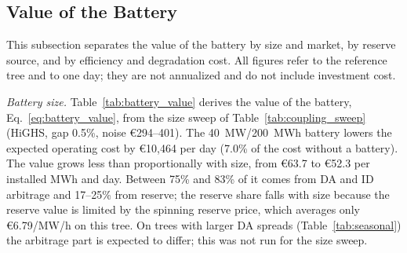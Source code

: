 \documentclass[5p,times,twocolumn]{elsarticle}
\begin{document}
\subsection{Value of the Battery}
\label{sec:attribution}
\label{sec:battery}
This subsection separates the value of the battery by size and market, by reserve source, and by efficiency and degradation cost. All figures refer to the reference tree and to one day; they are not annualized and do not include investment cost.

\textit{Battery size.} Table~\ref{tab:battery_value} derives the value of the battery, Eq.~\eqref{eq:battery_value}, from the size sweep of Table~\ref{tab:coupling_sweep} (HiGHS, gap 0.5\%, noise \euro 294--401). The 40~MW/200~MWh battery lowers the expected operating cost by \euro 10,464 per day (7.0\% of the cost without a battery). The value grows less than proportionally with size, from \euro 63.7 to \euro 52.3 per installed MWh and day. Between 75\% and 83\% of it comes from DA and ID arbitrage and 17--25\% from reserve; the reserve share falls with size because the reserve value is limited by the spinning reserve price, which averages only \euro 6.79/MW/h on this tree. On trees with larger DA spreads (Table~\ref{tab:seasonal}) the arbitrage part is expected to differ; this was not run for the size sweep.

\begin{table}[t]
\caption{Value of the battery by size on the reference tree (\euro{} per day), derived from Table~\ref{tab:coupling_sweep}. $V_B$: total value (Eq.~\eqref{eq:battery_value}); $V_B^{\text{en}}$: DA+ID arbitrage part; $V_B^{\text{res}}$: reserve part; cost without battery: \euro 149,055 (DA+ID) and \euro 149,037 (all markets).}
\label{tab:battery_value}
\centering
\scriptsize
\setlength{\tabcolsep}{3pt}
\end{table}
\end{document}
